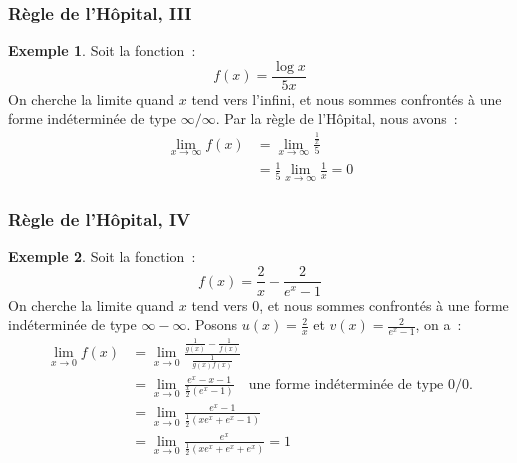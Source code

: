 \documentclass[10pt,notheorems]{beamer}
\theoremstyle{plain}
\theoremstyle{definition} %
\newtheorem{example}{Exemple}
\begin{document}
\begin{frame}
  \frametitle{Règle de l'Hôpital, III}

  \begin{example}
    Soit la fonction~:
    \[
      f(x) = \frac{\log x}{5x}
    \]
    On cherche la limite quand $x$ tend vers l'infini, et nous sommes
    confrontés à une forme indéterminée de type $\infty/\infty$. Par la règle de l'Hôpital, nous avons~:
    \[
      \begin{split}
        \lim_{x\rightarrow \infty} f(x) &= \lim_{x\rightarrow \infty} \frac{\frac{1}{x}}{5}\\
        &= \frac{1}{5}\lim_{x\rightarrow \infty} \frac{1}{x} = 0
      \end{split}
    \]
  \end{example}

\end{frame}


\begin{frame}
  \frametitle{Règle de l'Hôpital, IV}

  \begin{example}
    Soit la fonction~:
    \[
      f(x) = \frac{2}{x}-\frac{2}{e^x-1}
    \]
    On cherche la limite quand $x$ tend vers 0, et nous sommes
    confrontés à une forme indéterminée de type $\infty-\infty$. Posons $u(x) = \frac{2}{x}$ et $v(x)=\frac{2}{e^x-1}$, on a~:
    \[
      \begin{split}
        \lim_{x\rightarrow 0} f(x) &= \lim_{x\rightarrow 0} \frac{\frac{1}{g(x)}-\frac{1}{f(x)}}{\frac{1}{g(x)f(x)}}\\
        &= \lim_{x\rightarrow 0} \frac{e^x-x-1}{\frac{x}{2}\left(e^x-1\right)}\quad \text{une forme indéterminée de type $0/0$.}\\
        &= \lim_{x\rightarrow 0} \frac{e^x-1}{\frac{1}{2}\left(xe^x+e^x-1\right)}\\
        &= \lim_{x\rightarrow 0} \frac{e^x}{\frac{1}{2}\left(xe^x+e^x+e^x\right)} = 1\\
      \end{split}
    \]
  \end{example}

\end{frame}
\end{document}
